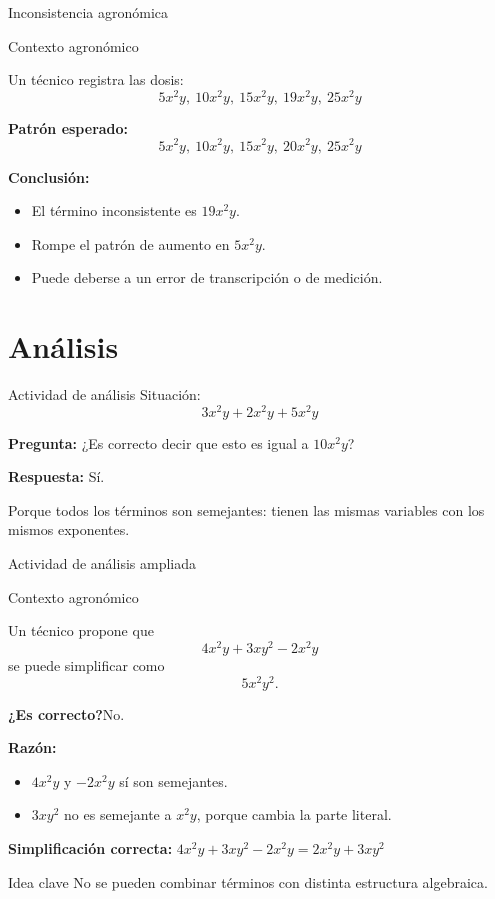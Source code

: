 \documentclass[handout,aspectratio=169,12pt]{beamer}
\newcommand{\IdeaClave}[1]{
	\begin{alertblock}{Idea clave}
		#1
	\end{alertblock}
}
\newcommand{\Agronomia}[1]{
	\begin{exampleblock}{Contexto agronómico}
		#1
	\end{exampleblock}
}
\begin{document}
	\begin{frame}{Inconsistencia agronómica}
		\Agronomia{
			Un técnico registra las dosis:
			\[
			5x^2y,\ 10x^2y,\ 15x^2y,\ 19x^2y,\ 25x^2y
			\]
		}
		
		\pause
		\textbf{Patrón esperado:}
		\[
		5x^2y,\ 10x^2y,\ 15x^2y,\ 20x^2y,\ 25x^2y
		\]
		
		\pause
		\textbf{Conclusión:}
		\begin{itemize}
			\item El término inconsistente es \(19x^2y\).
			\pause
			\item Rompe el patrón de aumento en \(5x^2y\).
			\pause
			\item Puede deberse a un error de transcripción o de medición.
		\end{itemize}
	\end{frame}
	
	\section{Análisis}
	\begin{frame}{Actividad de análisis}
		Situación:
		\[
		3x^2y + 2x^2y + 5x^2y
		\]
		
		\pause
		\textbf{Pregunta:} ¿Es correcto decir que esto es igual a \(10x^2y\)?
		
		\pause
		\textbf{Respuesta:} Sí.
		
		\pause
		Porque todos los términos son semejantes: tienen las mismas variables con los mismos exponentes.
	\end{frame}
	
	\begin{frame}{Actividad de análisis ampliada}
		\Agronomia{
			Un técnico propone que
			\[
			4x^2y + 3xy^2 - 2x^2y
			\]
			se puede simplificar como
			\[
			5x^2y^2.
			\]
		}
		
		\pause
		\textbf{¿Es correcto?}\pause No.
		
		\pause
		\textbf{Razón:}
		\begin{itemize}
			\item \(4x^2y\) y \(-2x^2y\) sí son semejantes.
			\pause
			\item \(3xy^2\) no es semejante a \(x^2y\), porque cambia la parte literal.
		\end{itemize}
		
		\pause
		\textbf{Simplificación correcta:} $	4x^2y + 3xy^2 - 2x^2y = 2x^2y + 3xy^2$
		
		\pause
		\IdeaClave{No se pueden combinar términos con distinta estructura algebraica.}
	\end{frame}
	
\end{document}
